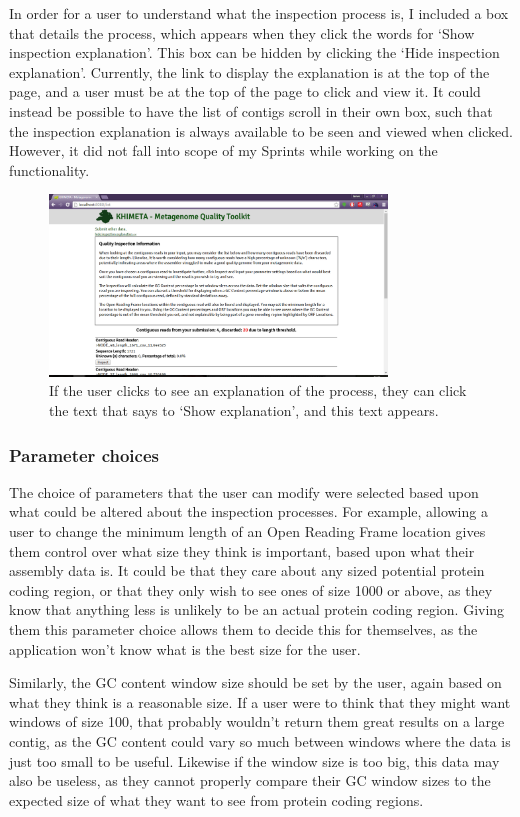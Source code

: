 In order for a user to understand what the inspection process is, I included a box that details the process, which appears when they click the words for `Show inspection explanation'. This box can be hidden by clicking the `Hide inspection explanation'. Currently, the link to display the explanation is at the top of the page, and a user must be at the top of the page to click and view it. It could instead be possible to have the list of contigs scroll in their own box, such that the inspection explanation is always available to be seen and viewed when clicked. However, it did not fall into scope of my Sprints while working on the functionality.

\begin{figure}[H]
	\centering
\includegraphics[width=0.8\textwidth]{images/ui4}
\caption{If the user clicks to see an explanation of the process, they can click the text that says to `Show explanation', and this text appears.}
\end{figure}

\subsubsection{Parameter choices}
The choice of parameters that the user can modify were selected based upon what could be altered about the inspection processes. For example, allowing a user to change the minimum length of an Open Reading Frame location gives them control over what size they think is important, based upon what their assembly data is. It could be that they care about any sized potential protein coding region, or that they only wish to see ones of size 1000 or above, as they know that anything less is unlikely to be an actual protein coding region. Giving them this parameter choice allows them to decide this for themselves, as the application won't know what is the best size for the user.

Similarly, the GC content window size should be set by the user, again based on what they think is a reasonable size. If a user were to think that they might want windows of size 100, that probably wouldn't return them great results on a large contig, as the GC content could vary so much between windows where the data is just too small to be useful. Likewise if the window size is too big, this data may also be useless, as they cannot properly compare their GC window sizes to the expected size of what they want to see from protein coding regions.

